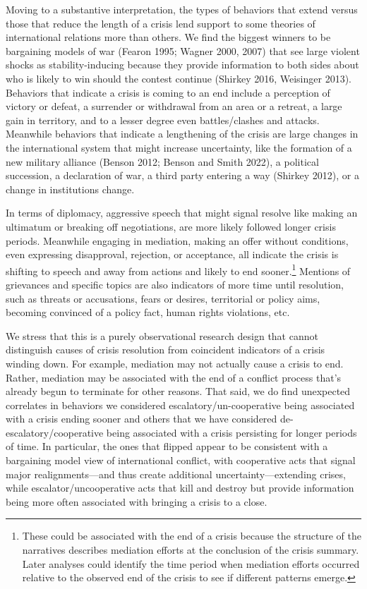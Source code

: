 \documentclass[
  letterpaper,
  DIV=11,
  numbers=noendperiod]{scrartcl}
\begin{document}
Moving to a substantive interpretation, the types of behaviors that
extend versus those that reduce the length of a crisis lend support to
some theories of international relations more than others. We find the
biggest winners to be bargaining models of war (Fearon 1995; Wagner
2000, 2007) that see large violent shocks as stability-inducing because
they provide information to both sides about who is likely to win should
the contest continue (Shirkey 2016, Weisinger 2013). Behaviors that
indicate a crisis is coming to an end include a perception of victory or
defeat, a surrender or withdrawal from an area or a retreat, a large
gain in territory, and to a lesser degree even battles/clashes and
attacks. Meanwhile behaviors that indicate a lengthening of the crisis
are large changes in the international system that might increase
uncertainty, like the formation of a new military alliance (Benson 2012;
Benson and Smith 2022), a political succession, a declaration of war, a
third party entering a way (Shirkey 2012), or a change in institutions
change.

In terms of diplomacy, aggressive speech that might signal resolve like
making an ultimatum or breaking off negotiations, are more likely
followed longer crisis periods. Meanwhile engaging in mediation, making
an offer without conditions, even expressing disapproval, rejection, or
acceptance, all indicate the crisis is shifting to speech and away from
actions and likely to end sooner.\footnote{These could be associated
  with the end of a crisis because the structure of the narratives
  describes mediation efforts at the conclusion of the crisis summary.
  Later analyses could identify the time period when mediation efforts
  occurred relative to the observed end of the crisis to see if
  different patterns emerge.} Mentions of grievances and specific topics
are also indicators of more time until resolution, such as threats or
accusations, fears or desires, territorial or policy aims, becoming
convinced of a policy fact, human rights violations, etc.

We stress that this is a purely observational research design that
cannot distinguish causes of crisis resolution from coincident
indicators of a crisis winding down. For example, mediation may not
actually cause a crisis to end. Rather, mediation may be associated with
the end of a conflict process that's already begun to terminate for
other reasons. That said, we do find unexpected correlates in behaviors
we considered escalatory/un-cooperative being associated with a crisis
ending sooner and others that we have considered
de-escalatory/cooperative being associated with a crisis persisting for
longer periods of time. In particular, the ones that flipped appear to
be consistent with a bargaining model view of international conflict,
with cooperative acts that signal major realignments---and thus create
additional uncertainty---extending crises, while escalator/uncooperative
acts that kill and destroy but provide information being more often
associated with bringing a crisis to a close.
\end{document}
